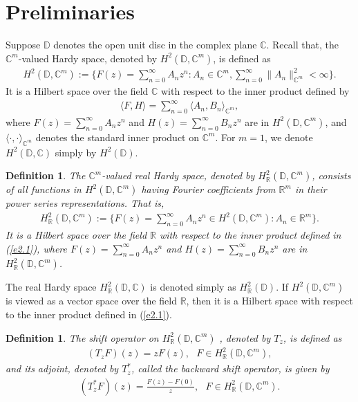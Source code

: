 \documentclass[11pt]{amsart}
\newtheorem{definition}[theorem]{Definition}
\numberwithin{equation}{section}
\newcommand{\bb}[1]{\mathbb{#1}}
\begin{document}
\section{Preliminaries} \label{PRE}
Suppose $\mathbb{D}$ denotes the open unit disc in the complex plane $\mathbb{C}$. Recall that, the $\mathbb{C}^m$-valued Hardy space, denoted by $H^2(\mathbb{D},\mathbb{C}^m)$, is defined as 
\begin{eqnarray*} 
 H^2(\mathbb{D},\mathbb{C}^m):=\Bigg\{F(z)=\sum_{n=0}^{\infty}A_nz^n: A_n \in \mathbb{C}^m, \sum_{n=0}^{\infty}\|A_n\|_{\mathbb{C}^m}^2 < \infty \Bigg\}.   
\end{eqnarray*}
It is a Hilbert space over the field $\mathbb{C}$ with respect to the inner product defined by
\begin{eqnarray}\label{e2.1}
\langle{F,H}\rangle=\sum_{n=0}^{\infty}\langle{A_n, B_n}\rangle_{\mathbb{C}^m},
\end{eqnarray}  
where
$F(z)=\sum_{n=0}^{\infty}A_n z^n $ and $H(z)=
 \sum_{n=0}^{\infty}B_n z^n$ are in $H^2(\mathbb{D},\mathbb{C}^m)$, and $\langle \cdot,\cdot \rangle_{\mathbb{C}^m}$  denotes the standard inner product on $\mathbb{C}^m$. For $m=1$, we denote $H^2(\mathbb{D}, \mathbb{C})$ simply by $H^2(\mathbb{D})$.
 
 \begin{definition}
   The $\mathbb{C}^m$-valued real Hardy space, denoted by $H^2_{\mathbb{R}}(\mathbb{D},\mathbb{C}^m)$, consists of all functions in $H^2(\mathbb{D},\mathbb{C}^m)$ having Fourier coefficients from $\mathbb{R}^m$ in their power series representations. That is,
\begin{eqnarray*} 
 H^2_{\mathbb{R}}(\mathbb{D},\mathbb{C}^m):=\Bigg\{F(z)=\sum_{n=0}^{\infty}A_nz^n \in H^2(\mathbb{D},\mathbb{C}^m) : A_n \in \mathbb{R}^m\Bigg\}.   
\end{eqnarray*}
It is a Hilbert space over the field $\mathbb{R}$ with respect to the inner product defined in (\ref{e2.1}), where
$F(z)=\sum_{n=0}^{\infty}A_n z^n $ and $H(z)=
 \sum_{n=0}^{\infty}B_n z^n$ are in $H^2_\mathbb{R}(\mathbb{D},\mathbb{C}^m)$. 
\end{definition}
 
The real Hardy space $H^2_\mathbb{R}(\bb D,\bb C)$ 
is denoted simply as $H^2_\mathbb{R}(\bb D)$. 
If $H^2(\mathbb{D},\mathbb{C}^m)$ is viewed as a vector space over the field $\mathbb{R}$, then it is a Hilbert space with respect to the inner product defined in (\ref{e2.1}).

\begin{definition}
 The \textit{shift operator} on $H^2_{\mathbb{R}}(\mathbb{D},\mathbb{C}^m)$ , denoted by $T_z$, is defined as 
\begin{eqnarray*}
    (T_zF)(z)=zF(z), \text{ }F\in H^2_{\mathbb{R}}(\mathbb{D},\mathbb{C}^m),
\end{eqnarray*}
and its adjoint, denoted by $T^*_z$, called the \textit{backward shift operator}, is given by
\begin{eqnarray*}
    (T^*_zF)(z)=\frac{F(z)-F(0)}{z}, \text{ } F\in H^2_{\mathbb{R}}(\mathbb{D},\mathbb{C}^m).
\end{eqnarray*}   
\end{definition}
 
\end{document}
